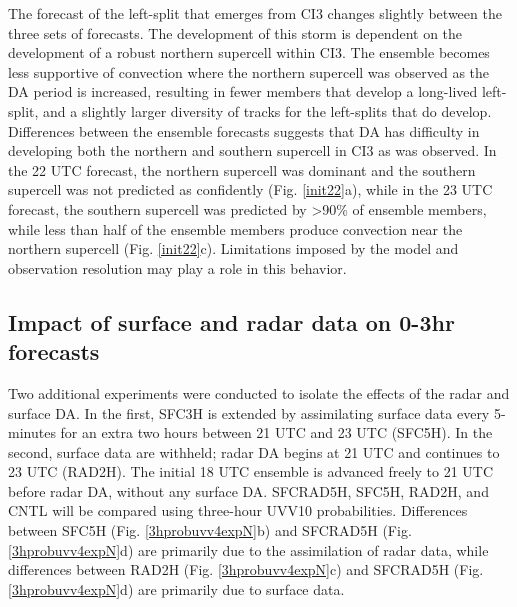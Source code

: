 The forecast of the left-split that emerges from CI3 changes slightly between the three sets of forecasts. The development of this storm is dependent on the development of a robust northern supercell within CI3. The ensemble becomes less supportive of convection where the northern supercell was observed as the DA period is increased,  resulting in fewer members that develop a long-lived left-split, and a slightly larger diversity of tracks for the left-splits that do develop. Differences between the ensemble forecasts suggests that DA has difficulty in developing both the northern and southern supercell in CI3 as was observed. In the 22 UTC forecast, the northern supercell was dominant and the southern supercell was not predicted as confidently (Fig. \ref{init22}a), while in the 23 UTC forecast, the southern supercell was predicted by \textgreater 90\% of ensemble members, while less than half of the ensemble members produce convection near the northern supercell (Fig. \ref{init22}c). Limitations imposed by the model and observation resolution may play a role in this behavior.

\subsection{Impact of surface and radar data on 0-3hr forecasts}
Two additional experiments were conducted to isolate the effects of the radar and surface DA. In the first, SFC3H is extended by assimilating surface data every 5-minutes for an extra two hours between 21 UTC and 23 UTC (SFC5H). In the second, surface data are withheld; radar DA begins at 21 UTC and continues to 23 UTC (RAD2H). The initial 18 UTC ensemble is advanced freely to 21 UTC before radar DA, without any surface DA. SFCRAD5H, SFC5H, RAD2H, and CNTL will be compared using three-hour UVV10 probabilities. Differences between SFC5H (Fig. \ref{3hprobuvv4expN}b) and SFCRAD5H (Fig. \ref{3hprobuvv4expN}d) are primarily due to the assimilation of radar data, while differences between RAD2H (Fig. \ref{3hprobuvv4expN}c) and SFCRAD5H (Fig. \ref{3hprobuvv4expN}d) are primarily due to surface data.


